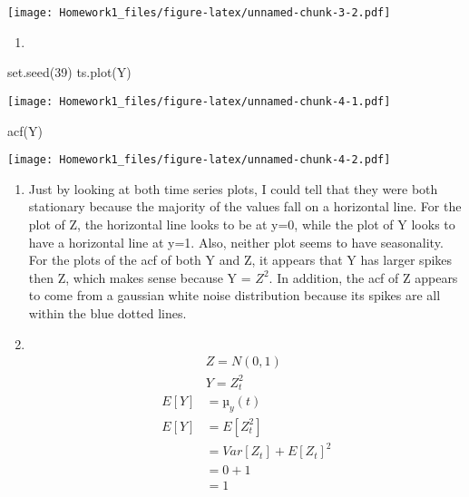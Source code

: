 \documentclass[
]{article}
\newenvironment{Shaded}{\begin{snugshade}}{\end{snugshade}}
\newcommand{\DecValTok}[1]{\textcolor[rgb]{0.00,0.00,0.81}{#1}}
\newcommand{\FunctionTok}[1]{\textcolor[rgb]{0.00,0.00,0.00}{#1}}
\newcommand{\NormalTok}[1]{#1}
\providecommand{\tightlist}{%
  \setlength{\itemsep}{0pt}\setlength{\parskip}{0pt}}
\begin{document}
\texttt{[image: Homework1\_files/figure-latex/unnamed-chunk-3-2.pdf]}

\begin{enumerate}
\def\labelenumi{(\alph{enumi})}
\setcounter{enumi}{1}
\tightlist
\item
\end{enumerate}

\begin{Shaded}
\begin{Highlighting}[]
\FunctionTok{set.seed}\NormalTok{(}\DecValTok{39}\NormalTok{)}
\FunctionTok{ts.plot}\NormalTok{(Y)}
\end{Highlighting}
\end{Shaded}

\texttt{[image: Homework1\_files/figure-latex/unnamed-chunk-4-1.pdf]}

\begin{Shaded}
\begin{Highlighting}[]
\FunctionTok{acf}\NormalTok{(Y)}
\end{Highlighting}
\end{Shaded}

\texttt{[image: Homework1\_files/figure-latex/unnamed-chunk-4-2.pdf]}

\begin{enumerate}
\def\labelenumi{(\alph{enumi})}
\setcounter{enumi}{2}
\item
  Just by looking at both time series plots, I could tell that they were
  both stationary because the majority of the values fall on a
  horizontal line. For the plot of Z, the horizontal line looks to be at
  y=0, while the plot of Y looks to have a horizontal line at y=1. Also,
  neither plot seems to have seasonality. For the plots of the acf of
  both Y and Z, it appears that Y has larger spikes then Z, which makes
  sense because Y = \(Z^2\). In addition, the acf of Z appears to come
  from a gaussian white noise distribution because its spikes are all
  within the blue dotted lines.
\item
  ~ \[
  \begin{aligned}
  & Z = N(0,1)\\
  & Y = Z_{t}^2\\
  E[Y] & = µ_{y}(t)\\
  E[Y] & = E[Z_{t}^2]\\
  & = Var[Z_{t}]+E[Z_{t}]^2\\
  & = 0 + 1\\
  &=1
  \end{aligned}
  \]\\
\end{enumerate}
\end{document}
